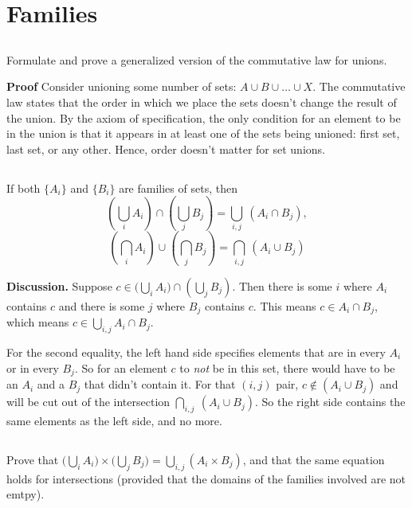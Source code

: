 \documentclass{article}
\begin{document}
\section{Families}

\subsection{} Formulate and prove a generalized version of the commutative law for unions.

\textbf{Proof} Consider unioning some number of sets: $A \cup B \cup \ldots \cup X$. The commutative law states that the order in which we place the sets doesn't change the result of the union. By the axiom of specification, the only condition for an element to be in the union is that it appears in at least one of the sets being unioned: first set, last set, or any other. Hence, order doesn't matter for set unions.

\subsection{} If both $\{A_i\}$ and $\{B_i\}$ are families of sets, then
$$\left(\bigcup_i A_i\right) \cap \left(\bigcup_j B_j\right) = \bigcup_{i, j} \ (A_i \cap B_j),$$
$$\left(\bigcap_i A_i \right) \cup \left(\bigcap_j B_j\right) = \bigcap_{i, j}\  (A_i \cup B_j)$$

\textbf{Discussion.} Suppose $c \in \Big(\bigcup_i A_i\Big) \cap \left(\bigcup_j B_j\right)$. Then there is some $i$ where $A_i$ contains $c$ and there is some $j$ where $B_j$ contains $c$. This means $c \in A_i \cap B_j$, which means $c \in \bigcup_{i, j} A_i \cap B_j$. 

For the second equality, the left hand side specifies elements that are in every $A_i$ or in every $B_j$. So for an element $c$ to \textit{not} be in this set, there would have to be an $A_i$ and a $B_j$ that didn't contain it. For that $(i, j)$ pair, $c \not\in (A_i \cup B_j)$ and will be cut out of the intersection $\bigcap_{i, j} \ (A_i \cup B_j)$. So the right side contains the same elements as the left side, and no more.

\subsection{} Prove that $\Big(\bigcup_i A_i \Big) \times \Big( \bigcup_j B_j \Big) = \bigcup_{i,j}\left(A_i \times B_j\right)$, and that the same equation holds for intersections (provided that the domains of the families involved are not emtpy).
\end{document}
